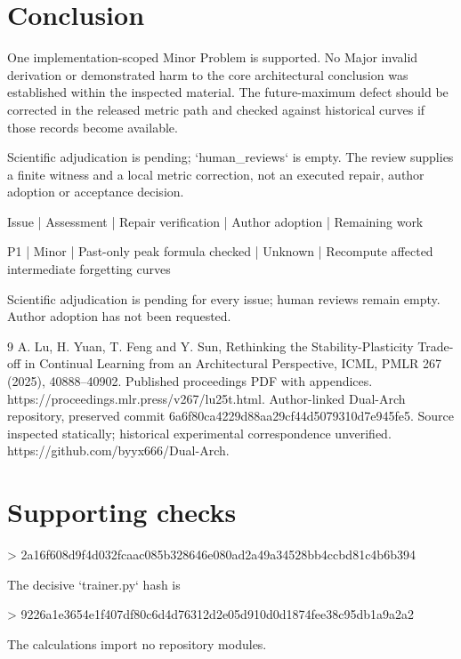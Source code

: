 \documentclass[10pt]{article}
\begin{document}
\section*{Conclusion}
One implementation-scoped Minor Problem is supported. No Major invalid derivation or demonstrated harm to the core architectural conclusion was established within the inspected material. The future-maximum defect should be corrected in the released metric path and checked against historical curves if those records become available.\par
Scientific adjudication is pending; `human\_reviews` is empty. The review supplies a finite witness and a local metric correction, not an executed repair, author adoption or acceptance decision.\par
Issue | Assessment | Repair verification | Author adoption | Remaining work\par
P1 | Minor | Past-only peak formula checked | Unknown | Recompute affected intermediate forgetting curves\par
Scientific adjudication is pending for every issue; human reviews remain empty. Author adoption has not been requested.\par
9 A. Lu, H. Yuan, T. Feng and Y. Sun, Rethinking the Stability-Plasticity Trade-off in Continual Learning from an Architectural Perspective, ICML, PMLR 267 (2025), 40888–40902. Published proceedings PDF with appendices. https://proceedings.mlr.press/v267/lu25t.html. Author-linked Dual-Arch repository, preserved commit 6a6f80ca4229d88aa29cf44d5079310d7e945fe5. Source inspected statically; historical experimental correspondence unverified. https://github.com/byyx666/Dual-Arch.\par
\section*{Supporting checks}
> 2a16f608d9f4d032fcaac085b328646e080ad2a49a34528bb4ccbd81c4b6b394\par
The decisive `trainer.py` hash is\par
> 9226a1e3654e1f407df80c6d4d76312d2e05d910d0d1874fee38c95db1a9a2a2\par
The calculations import no repository modules.\par
\end{document}
